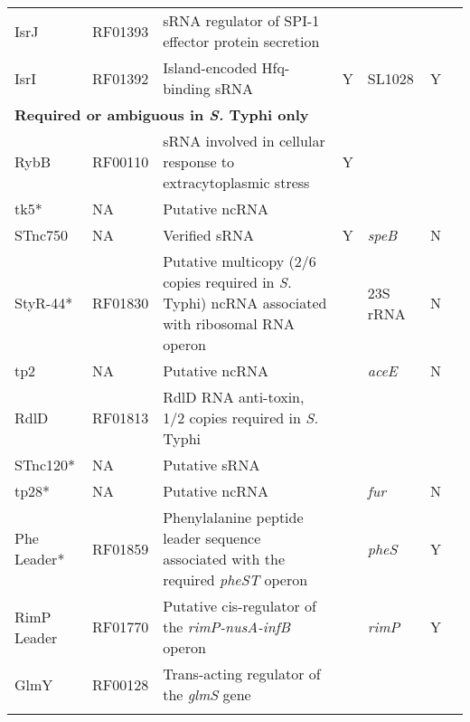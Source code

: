 \begin{longtable}{ l
    				p{0.3in}
				p{1.5in}
				c
				p{0.5in}
				p{0.5in}
				p{1in}
				}
    IsrJ  & RF01393 & sRNA regulator of SPI-1 effector protein secretion &       &       &       &  \textcite{Sittka2008, Padalon-Brauch2008} \\
    IsrI  & RF01392 & Island-encoded Hfq-binding sRNA & Y     & SL1028 & Y     &  \textcite{Sittka2008, Padalon-Brauch2008, Chao2012} \\
     \multicolumn{7}{l}{\textbf{Required or ambiguous in {\it S.} Typhi only}}\\
    RybB  & RF00110 & sRNA involved in cellular response to extracytoplasmic stress & Y     &       &       &  \textcite{Vogel2009a} \\
    tk5*  & NA    & Putative ncRNA &       &       &       & \textcite{Raghavan2011,Rivas2001} \\
    STnc750 & NA    & Verified sRNA & Y     & {\it speB}  & N     & \textcite{Kroger2012, Chao2012} \\
    StyR-44* & RF01830 & Putative multicopy (2/6 copies required in {\it S.} Typhi) ncRNA associated with ribosomal RNA operon &       & 23S rRNA & N     &  \textcite{Chinni2010} \\
    tp2   & NA    & Putative ncRNA &       & {\it aceE}  & N     &  \textcite{Raghavan2011,Rivas2001} \\
    RdlD  & RF01813 & RdlD RNA anti-toxin, 1/2 copies required in {\it S.} Typhi &       &       &       & \textcite{Kawano2002} \\
    STnc120* & NA    & Putative sRNA &       &       &       & \textcite{Sittka2008} \\
    tp28* & NA    & Putative ncRNA &       & {\it fur}   & N     &  \textcite{Raghavan2011,Rivas2001} \\
    Phe Leader* & RF01859 & Phenylalanine peptide leader sequence associated with the required {\it pheST} operon &       & {\it pheS}  & Y     & \textcite{Zurawski1978} \\
    RimP Leader & RF01770 & Putative cis-regulator of the {\it rimP-nusA-infB} operon &       & {\it rimP}  & Y     & \textcite{Naville2010} \\
    GlmY  & RF00128 & Trans-acting regulator of the {\it glmS} gene &       &       &       & \textcite{Urban2008} \\
    \bottomrule
    \label{tab:ncrna}%
    \end{longtable}%
\endgroup

